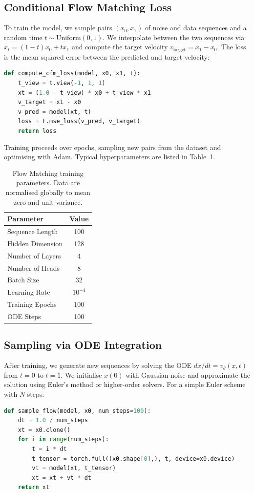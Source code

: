 \subsection{Conditional Flow Matching Loss}

To train the model, we sample pairs $(x_0,x_1)$ of noise and data
sequences and a random time $t\sim\mathrm{Uniform}(0,1)$.  We
interpolate between the two sequences via $x_t = (1-t)x_0 + tx_1$ and
compute the target velocity $v_{\text{target}} = x_1 - x_0$.  The
loss is the mean squared error between the predicted and target
velocity:
\begin{lstlisting}[language=Python, caption=CFM Loss]
def compute_cfm_loss(model, x0, x1, t):
    t_view = t.view(-1, 1, 1)
    xt = (1.0 - t_view) * x0 + t_view * x1
    v_target = x1 - x0
    v_pred = model(xt, t)
    loss = F.mse_loss(v_pred, v_target)
    return loss
\end{lstlisting}

Training proceeds over epochs, sampling new pairs from the dataset and
optimising with Adam.  Typical hyperparameters are listed in
Table~\ref{tab:fmparams}.

\begin{table}[H]
  \centering
  \begin{tabular}{lc}
    \toprule
    Parameter & Value \\
    \midrule
    Sequence Length & 100 \\
    Hidden Dimension & 128 \\
    Number of Layers & 4 \\
    Number of Heads & 8 \\
    Batch Size & 32 \\
    Learning Rate & $10^{-4}$ \\
    Training Epochs & 100 \\
    ODE Steps & 100 \\
    \bottomrule
  \end{tabular}
  \caption{Flow Matching training parameters.  Data are normalised
    globally to mean zero and unit variance.}
  \label{tab:fmparams}
\end{table}

\subsection{Sampling via ODE Integration}

After training, we generate new sequences by solving the ODE
\(dx/dt = v_\theta(x,t)\) from $t=0$ to $t=1$.  We initialise $x(0)$
with Gaussian noise and approximate the solution using Euler's method
or higher-order solvers.  For a simple Euler scheme with $N$ steps:
\begin{lstlisting}[language=Python, caption=Euler Sampling for Flow]
def sample_flow(model, x0, num_steps=100):
    dt = 1.0 / num_steps
    xt = x0.clone()
    for i in range(num_steps):
        t = i * dt
        t_tensor = torch.full((x0.shape[0],), t, device=x0.device)
        vt = model(xt, t_tensor)
        xt = xt + vt * dt
    return xt
\end{lstlisting}

